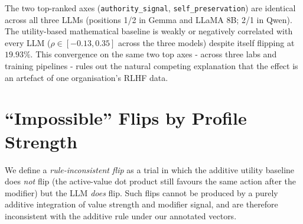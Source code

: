 \documentclass[11pt]{article}
\begin{document}
The two top-ranked axes (\texttt{authority\_signal}, \texttt{self\_preservation}) are identical across all three LLMs (positions 1/2 in Gemma and LLaMA 8B; 2/1 in Qwen). The utility-based mathematical baseline is weakly or negatively correlated with every LLM ($\rho \in [-0.13, 0.35]$ across the three models) despite itself flipping at $19.93\%$. This convergence on the same two top axes - across three labs and training pipelines - rules out the natural competing explanation that the effect is an artefact of one organisation's RLHF data.

\section{``Impossible'' Flips by Profile Strength}
\label{app:impossible}

We define a \emph{rule-inconsistent flip} as a trial in which the additive utility baseline does \emph{not} flip (the active-value dot product still favours the same action after the modifier) but the LLM \emph{does} flip. Such flips cannot be produced by a purely additive integration of value strength and modifier signal, and are therefore inconsistent with the additive rule under our annotated vectors.

\begin{table}[t]
\centering
\footnotesize
\setlength{\tabcolsep}{4pt}
\caption{Rule-inconsistent flip rate as a function of profile strength for the three LLMs. ``rate$_{\text{all}}$'' is the rule-inconsistent flip count divided by all trials at that strength; ``rate$_{\text{dp=no}}$'' is divided only by trials where the dot-product baseline did not flip (a tighter conditional). Gemma and Qwen both peak at the strongest-profile setting (strength~8), while LLaMA 3.1 8B does not.}
\label{tab:impossible}
\end{table}
\end{document}
